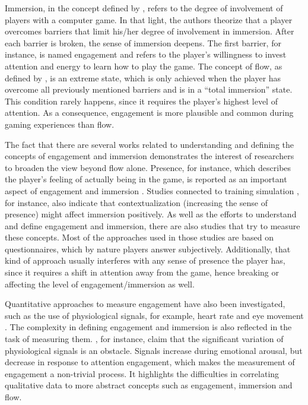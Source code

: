 Immersion, in the concept defined by \textcite{brown2004grounded}, refers to the degree of involvement of players with a computer game. In that light, the authors theorize that a player overcomes barriers that limit his/her degree of involvement in immersion. After each barrier is broken, the sense of immersion deepens. The first barrier, for instance, is named engagement and refers to the player's willingness to invest attention and energy to learn how to play the game. The concept of flow, as defined by \textcite{nakamura2014concept}, is an extreme state, which is only achieved when the player has overcome all previously mentioned barriers and is in a ``total immersion'' state. This condition rarely happens, since it requires the player's highest level of attention. As a consequence, engagement is more plausible and common during gaming experiences than flow.

The fact that there are several works \parencite{boyle2012engagement} related to understanding and defining the concepts of engagement and immersion demonstrates the interest of researchers to broaden the view beyond flow alone. Presence, for instance, which describes the player's feeling of actually being in the game, is reported as an important aspect of engagement and immersion \parencite{weibel2011immersion}. Studies connected to training simulation \parencite{engstrom2016impact}, for instance, also indicate that contextualization (increasing the sense of presence) might affect immersion positively. As well as the efforts to understand and define engagement and immersion, there are also studies that try to measure these concepts. Most of the approaches used in those studies are based on questionnaires, which by nature players answer subjectively. Additionally, that kind of approach usually interferes with any sense of presence the player has, since it requires a shift in attention away from the game, hence breaking or affecting the level of engagement/immersion as well.

Quantitative approaches to measure engagement have also been investigated, such as the use of physiological signals, for example, heart rate \parencite{ravaja20051} and eye movement \parencite{jennett2008measuring}. The complexity in defining engagement and immersion is also reflected in the task of measuring them. \textcite{ravaja20051}, for instance, claim that the significant variation of physiological signals is an obstacle. Signals increase during emotional arousal, but decrease in response to attention engagement, which makes the measurement of engagement a non-trivial process. It highlights the difficulties in correlating qualitative data to more abstract concepts such as engagement, immersion and flow.

